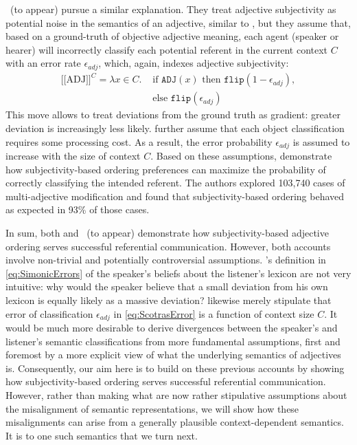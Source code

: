 \documentclass[10pt,a4paper]{article}
\newcommand{\sem}[1]{\mbox{$[\![$#1$]\!]$}}
\begin{document}
\citeauthor{scontrasetalSPadjectives}~(to appear) pursue a similar explanation. They treat adjective subjectivity as potential noise in the semantics of an adjective, similar to \citeauthor{simonic2018}, but they assume that, based on a ground-truth of objective adjective meaning, each agent (speaker or hearer) will incorrectly classify each potential referent in the current context $C$ with an error rate $\epsilon_{adj}$, which, again, indexes adjective subjectivity:
\begin{align}
  \label{eq:ScotrasError}
  \sem{ADJ}^C  = \lambda x \in C. & \textrm{ if } \texttt{ADJ}(x) \textrm{ then } 
  \texttt{flip}(1- \epsilon_{adj}),\\
  &  \textrm{ else } \texttt{flip}(\epsilon_{adj}) \nonumber
\end{align}
This move allows \citeauthor{scontrasetalSPadjectives} to treat deviations from the ground truth as gradient: greater deviation is increasingly less likely. \citeauthor{scontrasetalSPadjectives} further assume that each object classification requires some processing cost. As a result, the error probability $\epsilon_{adj}$ is assumed to increase with the size of context $C$. Based on these assumptions, \citeauthor{scontrasetalSPadjectives} demonstrate how subjectivity-based ordering preferences can maximize the probability of correctly classifying the intended referent. The authors explored 103,740 cases of multi-adjective modification and found that subjectivity-based ordering behaved as expected in 93\% of those cases.

In sum, both  and \citeauthor{scontrasetalSPadjectives}~(to appear) demonstrate how subjectivity-based adjective ordering serves successful referential communication. However, both accounts involve non-trivial and potentially controversial assumptions. \citeauthor{simonic2018}'s definition in \eqref{eq:SimonicErrors} of the speaker's beliefs about the listener's lexicon are not very intuitive: why would the speaker believe that a small deviation from his own lexicon is equally likely as a massive deviation?  likewise merely stipulate that error of classification $\epsilon_{adj}$ in \eqref{eq:ScotrasError} is a function of context size $C$. It would be much more desirable to derive divergences between the speaker's and listener's semantic classifications from more fundamental assumptions, first and foremost by a more explicit view of what the underlying semantics of adjectives is. Consequently, our aim here is to build on these previous accounts by showing how subjectivity-based ordering serves successful referential communication. However, rather than making what are now rather stipulative assumptions about the misalignment of semantic representations, we will show how these misalignments can arise from a generally plausible context-dependent semantics. It is to one such semantics that we turn next.
\end{document}
